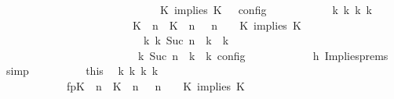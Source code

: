 \begin{isabellebody}
\ \ \ \ \ \ \ \ \ \ \ \ \ \ \ \ \ \ \ \ \ \ \ \ \ \ {\isasymturnstile}\ {\isasymPsi}\ {\isasymtriangleright}\ {\isacharparenleft}{\isacharparenleft}K\ implies\ K\ {\isacharhash}\ {\isasymPhi}{\isacharparenright}\ {\isasymrbrakk}\isactrlsub c\isactrlsub o\isactrlsub n\isactrlsub f\isactrlsub i\isactrlsub g{\isacartoucheclose}\isanewline
\ \ \ \ \ \ \ \ \isamarkupfalse%
\ \isamarkupfalse%
\ {\isacartoucheopen}{\isasymexists}{\isasymGamma}\isactrlsub k\ {\isasymPsi}\isactrlsub k\ {\isasymPhi}\isactrlsub k\ k{\isachardot}\ {\isacharparenleft}\isanewline
\ \ \ \ \ \ \ \ \ \ \ \ \ \ \ \ \ \ \ \ \ \ \ \ {\isacharparenleft}{\isacharparenleft}{\isacharparenleft}K\ {\isasymUp}\ n{\isacharparenright}\ {\isacharhash}\ {\isacharparenleft}K\ {\isasymUp}\ n{\isacharparenright}\ {\isacharhash}\ {\isasymGamma}{\isacharparenright}{\isacharcomma}\ n\ {\isasymturnstile}\ {\isasymPsi}\ {\isasymtriangleright}\ {\isacharparenleft}{\isacharparenleft}K\ implies\ K\ {\isacharhash}\ {\isasymPhi}{\isacharparenright}{\isacharparenright}\isanewline
\ \ \ \ \ \ \ \ \ \ \ \ \ \ \ \ \ \ \ \ \ \ \ \ \ \ {\isasymhookrightarrow}\isactrlbsup k\isactrlesup \ {\isacharparenleft}{\isasymGamma}\isactrlsub k{\isacharcomma}\ Suc\ n\ {\isasymturnstile}\ {\isasymPsi}\isactrlsub k\ {\isasymtriangleright}\ {\isasymPhi}\isactrlsub k{\isacharparenright}\isanewline
\ \ \ \ \ \ \ \ \ \ \ \ \ \ \ \ \ \ \ \ {\isacharparenright}\ {\isasymand}\ {\isasymrho}\ {\isasymin}\ {\isasymlbrakk}\ {\isasymGamma}\isactrlsub k{\isacharcomma}\ Suc\ n\ {\isasymturnstile}\ {\isasymPsi}\isactrlsub k\ {\isasymtriangleright}\ {\isasymPhi}\isactrlsub k\ {\isasymrbrakk}\isactrlsub c\isactrlsub o\isactrlsub n\isactrlsub f\isactrlsub i\isactrlsub g{\isacartoucheclose}\isanewline
\ \ \ \ \ \ \ \ \ \ \isamarkupfalse%
\ h{}\ Implies{\isachardot}prems\ \isamarkupfalse%
\ simp\isanewline
\ \ \ \ \ \ \ \ \isamarkupfalse%
\ this\ \isamarkupfalse%
\ {\isasymGamma}\isactrlsub k\ {\isasymPsi}\isactrlsub k\ {\isasymPhi}\isactrlsub k\ k\ \isanewline
\ \ \ \ \ \ \ \ \ \ \ \ fp{\isacharcolon}{\isacartoucheopen}{\isacharparenleft}{\isacharparenleft}{\isacharparenleft}K\ {\isasymUp}\ n{\isacharparenright}\ {\isacharhash}\ {\isacharparenleft}K\ {\isasymUp}\ n{\isacharparenright}\ {\isacharhash}\ {\isasymGamma}{\isacharparenright}{\isacharcomma}\ n\ {\isasymturnstile}\ {\isasymPsi}\ {\isasymtriangleright}\ {\isacharparenleft}{\isacharparenleft}K\ implies\ K\ {\isacharhash}\ {\isasymPhi}{\isacharparenright}{\isacharparenright}\isanewline

\end{isabellebody}

